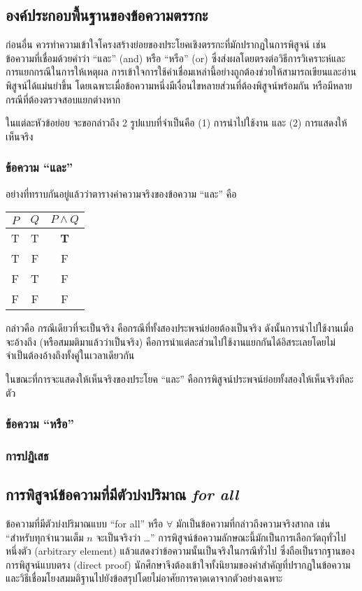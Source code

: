 \subsection{องค์ประกอบพื้นฐานของข้อความตรรกะ}
ก่อนอื่น ควรทำความเข้าใจโครงสร้างย่อยของประโยคเชิงตรรกะที่มักปรากฏในการพิสูจน์ เช่น ข้อความที่เชื่อมด้วยคำว่า “และ” (and) หรือ “หรือ” (or) ซึ่งส่งผลโดยตรงต่อวิธีการวิเคราะห์และการแยกกรณีในการให้เหตุผล การเข้าใจการใช้คำเชื่อมเหล่านี้อย่างถูกต้องช่วยให้สามารถเขียนและอ่านพิสูจน์ได้แม่นยำขึ้น โดยเฉพาะเมื่อข้อความหนึ่งมีเงื่อนไขหลายส่วนที่ต้องพิสูจน์พร้อมกัน หรือมีหลายกรณีที่ต้องตรวจสอบแยกต่างหาก

ในแต่ละหัวข้อย่อย จะขอกล่าวถึง 2 รูปแบบที่จำเป็นคือ (1) การนำไปใช้งาน และ (2) การแสดงให้เห็นจริง

\subsubsection{ข้อความ ``และ''}
อย่างที่ทราบกันอยู่แล้วว่าตารางค่าความจริงของข้อความ ``และ'' คือ
\begin{center}
	\begin{tabular}{|c|c|c|}
		\hline
		$P$ & $Q$ & $P \land Q$ \\
		\hline
		T & T & \textbf{T} \\
		T & F & F \\
		F & T & F \\
		F & F & F \\
		\hline
	\end{tabular}
\end{center}
กล่าวคือ กรณีเดียวที่จะเป็นจริง คือกรณีที่ทั้งสองประพจน์ย่อยต้องเป็นจริง ดังนั้นการนำไปใช้งานเมื่อจะอ้างถึง (หรือสมมติมาแล้วว่าเป็นจริง) คือการนำแต่ละส่วนไปใช้งานแยกกันได้อิสระเลยโดยไม่จำเป็นต้องอ้างถึงทั้งคู่ในเวลาเดียวกัน

ในขณะที่การจะแสดงให้เห็นจริงของประโยค ``และ'' คือการพิสูจน์ประพจน์ย่อยทั้งสองให้เห็นจริงทีละตัว

\subsubsection{ข้อความ ``หรือ''}

\subsubsection{การปฏิเสธ}

\subsection{การพิสูจน์ข้อความที่มีตัวบ่งปริมาณ \textit{for all}}
ข้อความที่มีตัวบ่งปริมาณแบบ “for all” หรือ $\forall$ มักเป็นข้อความที่กล่าวถึงความจริงสากล เช่น “สำหรับทุกจำนวนเต็ม $n$ จะเป็นจริงว่า …” การพิสูจน์ข้อความลักษณะนี้มักเป็นการเลือกวัตถุทั่วไปหนึ่งตัว (arbitrary element) แล้วแสดงว่าข้อความนั้นเป็นจริงในกรณีทั่วไป ซึ่งถือเป็นรากฐานของการพิสูจน์แบบตรง (direct proof) นักศึกษาจึงต้องเข้าใจทั้งนิยามของคำสำคัญที่ปรากฏในข้อความ และวิธีเชื่อมโยงสมมติฐานไปยังข้อสรุปโดยไม่อาศัยการคาดเดาจากตัวอย่างเฉพาะ

